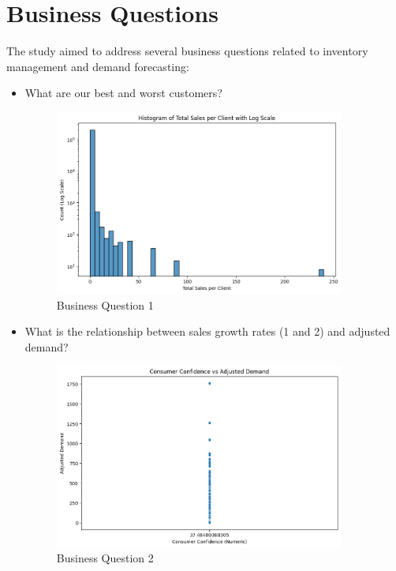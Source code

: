 \documentclass{article}
\begin{document}
\section{Business Questions}
The study aimed to address several business questions related to inventory management and demand forecasting:
\begin{itemize}
    \item What are our best and worst customers?
    
    \begin{figure}[H] 
        \begin{center}
        \centering
        \includegraphics[width=0.9\textwidth]{images/quest1.png}
        \caption{Business Question 1}
        \end{center}
    \end{figure} 

    \item What is the relationship between sales growth rates (1 and 2) and adjusted demand? 

    \begin{figure}[H] 
        \begin{center}
        \centering
        \includegraphics[width=0.9\textwidth]{images/quest2.png}
        \caption{Business Question 2}
        \end{center}
    \end{figure} 


\end{itemize}
\end{document}

